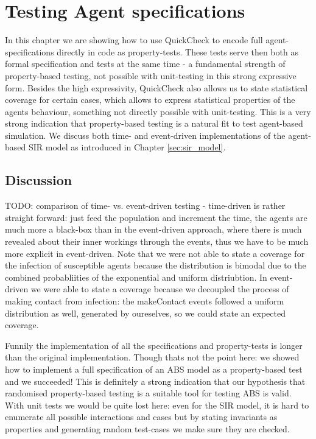 \chapter{Testing Agent specifications}
\label{ch:agentspec}

In this chapter we are showing how to use QuickCheck to encode full agent-specifications directly in code as property-tests. These tests serve then both as formal specification and tests at the same time - a fundamental strength of property-based testing, not possible with unit-testing in this strong expressive form. Besides the high expressivity, QuickCheck also allows us to state statistical coverage for certain cases, which allows to express statistical properties of the agents behaviour, something not directly possible with unit-testing. This is a very strong indication that property-based testing is a natural fit to test agent-based simulation. We discuss both time- and event-driven  implementations of the agent-based SIR model as introduced in Chapter \ref{sec:sir_model}.





\section{Discussion}
TODO: comparison of time- vs. event-driven testing
- time-driven is rather straight forward: just feed the population and increment the time, the agents are much more a black-box than in the event-driven approach, where there is much revealed about their inner workings through the events, thus we have to be much more explicit in event-driven. Note that we were not able to state a coverage for the infection of susceptible agents because the distribution is bimodal due to the combined probabliities of the exponential and uniform distriubtion. In event-driven we were able to state a coverage because we decoupled the process of making contact from infection: the makeContact events followed a uniform distribution as well, generated by oureselves, so we could state an expected coverage.

Funnily the implementation of all the specifications and property-tests is longer than the original implementation. Though thats not the point here: we showed how to implement a full specification of an ABS model as a property-based test and we succeeded! This is definitely a strong indication that our hypothesis that randomised property-based testing is a suitable tool for testing ABS is valid. With unit tests we would be quite lost here: even for the SIR model, it is hard to enumerate all possible interactions and cases but by stating invariants as properties and generating random test-cases we make sure they are checked.

